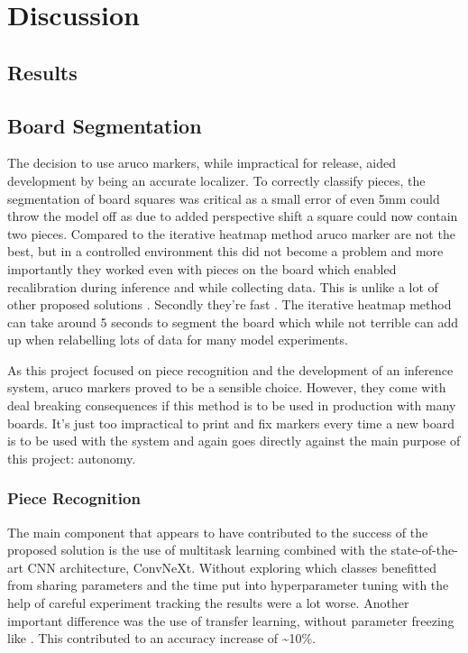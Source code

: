 \chapter{Discussion}
\label{conclusions}

\section{Results}

\section{Board Segmentation}
The decision to use aruco markers, while impractical for release, aided development by being an accurate localizer.
To correctly classify pieces, the segmentation of board squares was critical as a small error of even 5mm could throw the
model off as due to added perspective shift a square could now contain two pieces.  Compared to the iterative heatmap method \cite{} aruco 
marker are not the best, but in a controlled environment this did not become a problem and more importantly they worked even with pieces on the
board which enabled recalibration during inference and while collecting data.  This is unlike a lot of other proposed solutions \cite{}.
Secondly they're fast \cite{}.  The iterative heatmap method can take around 5 seconds to segment the board which while not terrible can add up when 
relabelling lots of data for many model experiments.

As this project focused on piece recognition and the development of an inference system, aruco markers proved to be a sensible choice.  However, 
they come with deal breaking consequences if this method is to be used in production with many boards.  It's just too impractical to print and fix
markers every time a new board is to be used with the system and again goes directly against the main purpose of this project: autonomy.

\subsection{Piece Recognition}
The main component that appears to have contributed to the success of the proposed solution is the use of multitask learning combined with the state-of-the-art
CNN architecture, ConvNeXt.  Without exploring which classes benefitted from sharing parameters and the time put into hyperparameter tuning with the help of 
careful experiment tracking the results were a lot worse.  Another important difference was the use of transfer learning, without parameter freezing like \cite{}. 
This contributed to an accuracy increase of \textasciitilde10\%.


